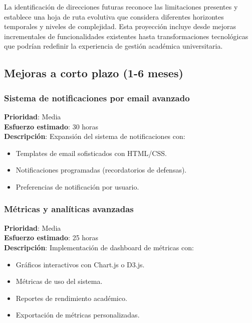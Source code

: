 \documentclass[12pt,a4paper,oneside]{report}
\providecommand{\tightlist}{%
  \setlength{\itemsep}{0pt}\setlength{\parskip}{0pt}}
\begin{document}
La identificación de direcciones futuras reconoce las limitaciones presentes y establece una hoja de ruta evolutiva que considera diferentes horizontes temporales y niveles de complejidad. Esta proyección incluye desde mejoras incrementales de funcionalidades existentes hasta transformaciones tecnológicas que podrían redefinir la experiencia de gestión académica universitaria.

\subsection{Mejoras a corto plazo (1-6
meses)}\label{mejoras-a-corto-plazo-1-6-meses}

\subsubsection{Sistema de notificaciones por email
avanzado}\label{sistema-de-notificaciones-por-email-avanzado}

\textbf{Prioridad}: Media\\
\textbf{Esfuerzo estimado}: 30 horas\\
\textbf{Descripción}: Expansión del sistema de notificaciones con:

\begin{itemize}
\tightlist
\item
  Templates de email sofisticados con HTML/CSS.
\item
  Notificaciones programadas (recordatorios de defensas).
\item
  Preferencias de notificación por usuario.
\end{itemize}

\subsubsection{Métricas y analíticas
avanzadas}\label{muxe9tricas-y-analytics-avanzadas}

\textbf{Prioridad}: Media\\
\textbf{Esfuerzo estimado}: 25 horas\\
\textbf{Descripción}: Implementación de dashboard de métricas con:

\begin{itemize}
\tightlist
\item
  Gráficos interactivos con Chart.js o D3.js.
\item
  Métricas de uso del sistema.
\item
  Reportes de rendimiento académico.
\item
  Exportación de métricas personalizadas.
\end{itemize}
\end{document}
